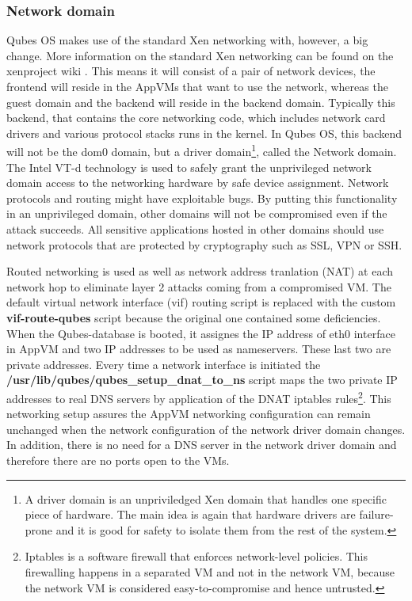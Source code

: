 \documentclass[runningheads,a4paper]{article}
\begin{document}
\subsubsection{Network domain}

Qubes OS makes use of the standard Xen networking with, however, a big
change. More information on the standard Xen networking can be found
on the xenproject wiki \cite{XenNetworking}. This means it will
consist of a pair of network devices, the frontend will reside in the
AppVMs that want to use the network, whereas the guest domain and the
backend will reside in the backend domain. Typically this backend,
that contains the core networking code, which includes network card
drivers and various protocol stacks runs in the kernel. In Qubes OS,
this backend will not be the dom0 domain, but a driver
domain\footnote{A driver domain is an unpriviledged Xen domain that
handles one specific piece of hardware. The main idea is again that
hardware drivers are failure-prone and it is good for safety to
isolate them from the rest of the system.}, called the Network
domain. The Intel VT-d technology is used to safely grant the
unprivileged network domain access to the networking hardware by safe
device assignment. Network protocols and routing might have
exploitable bugs. By putting this functionality in an unprivileged
domain, other domains will not be compromised even if the attack
succeeds. All sensitive applications hosted in other domains should
use network protocols that are protected by cryptography such as SSL,
VPN or SSH.

Routed networking is used as well as network address tranlation (NAT)
at each network hop to eliminate layer 2 attacks coming from a
compromised VM. The default virtual network interface (vif) routing
script is replaced with the custom \textbf{vif-route-qubes} script
because the original one contained some deficiencies. When the
Qubes-database is booted, it assignes the IP address of eth0 interface
in AppVM and two IP addresses to be used as nameservers. These last
two are private addresses. Every time a network interface is
initiated the \textbf{/usr/lib/qubes/qubes\_setup\_dnat\_to\_ns} script
maps the two private IP addresses to real DNS servers by application
of the DNAT iptables rules\footnote{Iptables is a software firewall that
enforces network-level policies. This firewalling happens in a
separated VM and not in the network VM, because the network VM is
considered easy-to-compromise and hence untrusted.}. This networking
setup assures the AppVM networking configuration can remain unchanged
when the network configuration of the network driver domain
changes. In addition, there is no need for a DNS server in the network
driver domain and therefore there are no ports open to the VMs.
\end{document}
